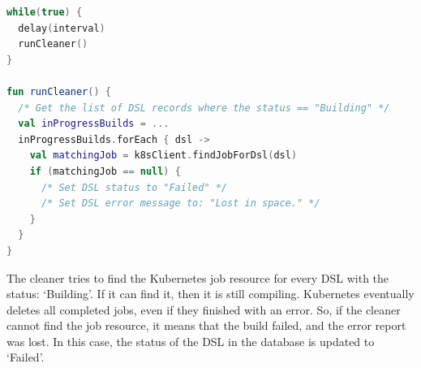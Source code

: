 \begin{lstlisting}[caption={Job cleaner loop},language=Kotlin,label=code:cleaner]
while(true) {
  delay(interval)
  runCleaner()
}

fun runCleaner() {
  /* Get the list of DSL records where the status == "Building" */
  val inProgressBuilds = ...
  inProgressBuilds.forEach { dsl ->
    val matchingJob = k8sClient.findJobForDsl(dsl)
    if (matchingJob == null) {
      /* Set DSL status to "Failed" */
      /* Set DSL error message to: "Lost in space." */
    }
  }
}
\end{lstlisting}

The cleaner tries to find the Kubernetes job resource for every DSL with the status: `Building'. If it can find it, then it is still compiling. Kubernetes eventually deletes all completed jobs, even if they finished with an error. So, if the cleaner cannot find the job resource, it means that the build failed, and the error report was lost. In this case, the status of the DSL in the database is updated to `Failed'.